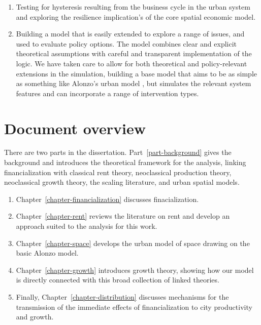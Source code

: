 \begin{enumerate}
    \item Testing for \gls{hysteresis} resulting from the business cycle in the urban system and exploring the \gls{resilience} implication's of the core spatial economic model.

    \item Building a model that is easily extended to explore a range of issues, and used to evaluate policy options. The model combines clear and explicit theoretical assumptions with careful and transparent implementation of the logic. We have taken care to allow for both theoretical and policy-relevant extensions in the simulation,  building a base model that aims to be as simple as something like Alonzo's urban model \cite{alonsoLocationLandUse1964}, but simulates the relevant system features and can incorporate a range of intervention types. 
\end{enumerate}

\section{Document overview}
There are two parts in the dissertation. Part~\ref{part-background} gives the background and introduces the theoretical framework for the analysis, linking financialization with classical rent theory, neoclassical production theory, neoclassical growth theory, the scaling literature, and urban spatial models. 

\begin{enumerate}
    \item Chapter~\ref{chapter-financialization} discusses finacialization.

    \item Chapter~\ref{chapter-rent} reviews the literature on rent and develop an approach suited to the analysis for this work.

    \item Chapter~\ref{chapter-space} develops the urban model of space drawing on the basic Alonzo model.

    \item Chapter~\ref{chapter-growth} introduces growth theory, showing how our model is directly connected with this broad collection of linked theories. 

    \item Finally, Chapter~\ref{chapter-distribution} discusses mechanisms for the transmission of the immediate effects of financialization to city productivity and growth.
\end{enumerate}
 
